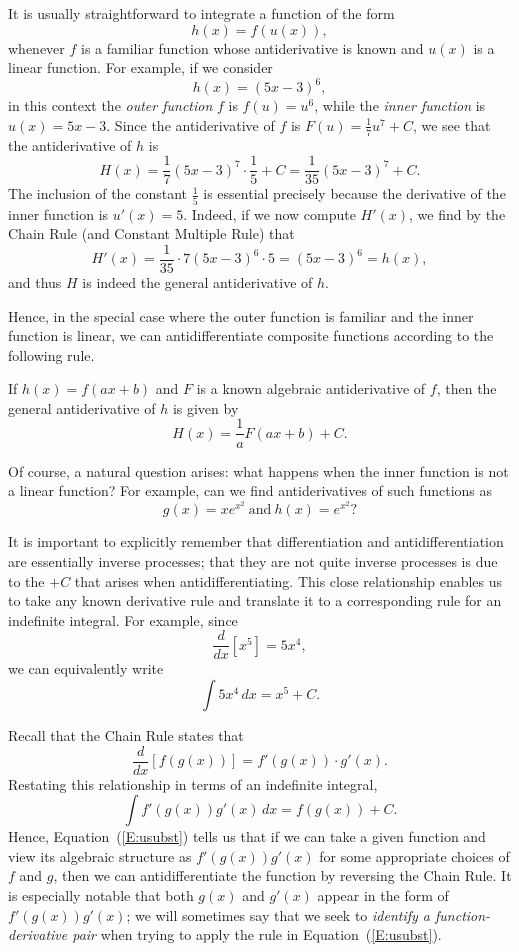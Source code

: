 It is usually straightforward to integrate a function of the form
$$h(x) = f(u(x)),$$
whenever $f$ is a familiar function whose antiderivative is known and $u(x)$ is a linear function.  For example, if we consider
$$h(x) = (5x-3)^6,$$
in this context the \textit{outer function} $f$ is $f(u) = u^6$, while the \textit{inner function} is $u(x) = 5x - 3$.  Since the antiderivative of $f$ is $F(u) = \frac{1}{7}u^7+C$, we 
see that the antiderivative of $h$ is
$$H(x) = \frac{1}{7} (5x-3)^7 \cdot \frac{1}{5} + C = \frac{1}{35} (5x-3)^7 + C.$$
The inclusion of the constant $\frac{1}{5}$ is essential precisely because the derivative of the inner function is $u'(x) = 5$.  Indeed, if we now compute $H'(x)$, we find by the Chain Rule (and Constant Multiple Rule) that
$$H'(x) = \frac{1}{35} \cdot 7(5x-3)^6 \cdot 5 = (5x-3)^6 = h(x),$$
and thus $H$ is indeed the general antiderivative of $h$.

Hence, in the special case where the outer function is familiar and the inner function is linear, we can antidifferentiate composite functions according to the following rule.


\begin{formulabox}[]{
If $h(x) = f(ax + b)$ and $F$ is a known algebraic antiderivative of $f$, then the general antiderivative of $h$ is given by
$$H(x) = \frac{1}{a} F(ax+b) + C.$$
}
\end{formulabox}

Of course, a natural question  arises: what happens when the inner function is not a linear function?  For example, can we find antiderivatives of such functions as 
$$g(x) = x e^{x^2} \ \mbox{and} \ h(x) = e^{x^2}?$$

It is important to explicitly remember that differentiation and antidifferentiation are essentially inverse processes; that they are not quite inverse processes is due to the $+C$ that arises when antidifferentiating.  This close relationship enables us to take any known derivative rule and translate it to a corresponding rule for an indefinite integral.  For example, since
$$\frac{d}{dx} \left[x^5\right] = 5x^4,$$
we can equivalently write
$$\int 5x^4 \, dx = x^5 + C.$$

Recall that the Chain Rule states that
$$\frac{d}{dx} \left[ f(g(x)) \right] = f'(g(x)) \cdot g'(x).$$
Restating this relationship in terms of an indefinite integral,
\begin{equation} \label{E:usubst}
\int f'(g(x)) g'(x) \, dx = f(g(x))+C.
\end{equation}
Hence, Equation~(\ref{E:usubst}) tells us that if we can take a given function and view its algebraic structure as $f'(g(x)) g'(x)$ for some appropriate choices of $f$ and $g$, then we can antidifferentiate the function by reversing the Chain Rule.  It is especially notable that both $g(x)$ and $g'(x)$ appear in the form of $f'(g(x)) g'(x)$; we will sometimes say that we seek to \emph{identify a function-derivative pair} when trying to apply the rule in Equation~(\ref{E:usubst}).


